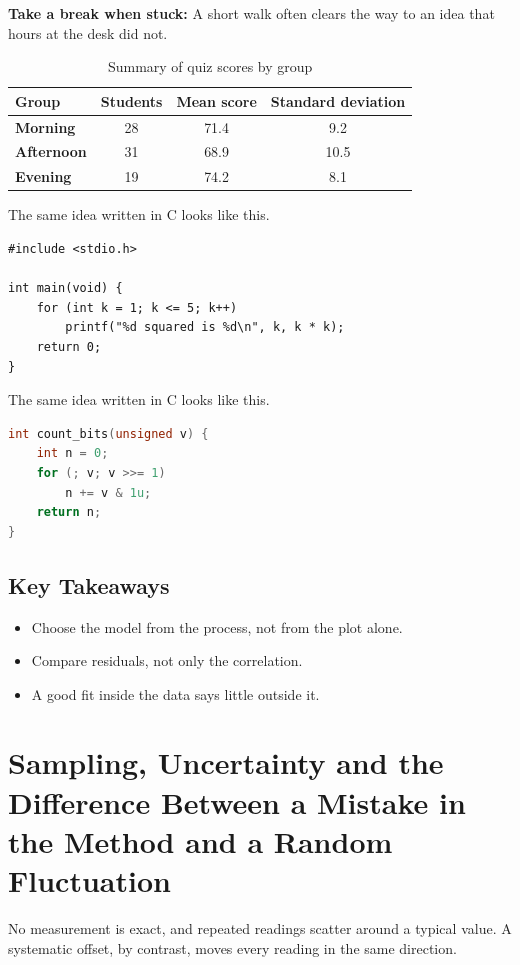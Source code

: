 \documentclass[11pt]{article}
\begin{document}
\textbf{Take a break when stuck:} A short walk often clears the way to an idea that hours at the desk did not.

\begin{table}[H]
\centering
\caption{Summary of quiz scores by group}
\begin{tabular}{lccc}
\toprule
\textbf{Group} & \textbf{Students} & \textbf{Mean score} & \textbf{Standard deviation} \\
\midrule
\textbf{Morning} & 28 & 71.4 & 9.2 \\
\textbf{Afternoon} & 31 & 68.9 & 10.5 \\
\textbf{Evening} & 19 & 74.2 & 8.1 \\
\bottomrule
\end{tabular}
\end{table}

The same idea written in C looks like this.

{\small\begin{verbatim}
#include <stdio.h>

int main(void) {
    for (int k = 1; k <= 5; k++)
        printf("%d squared is %d\n", k, k * k);
    return 0;
}
\end{verbatim}}

The same idea written in C looks like this.

\begin{lstlisting}[language=C]
int count_bits(unsigned v) {
    int n = 0;
    for (; v; v >>= 1)
        n += v & 1u;
    return n;
}
\end{lstlisting}

\subsection*{Key Takeaways}
\begin{itemize}
\item Choose the model from the process, not from the plot alone.
\item Compare residuals, not only the correlation.
\item A good fit inside the data says little outside it.
\end{itemize}

\section{Sampling, Uncertainty and the Difference Between a Mistake in the Method and a Random Fluctuation}

No measurement is exact, and repeated readings scatter around a typical value. A systematic offset, by contrast, moves every reading in the same direction.
\end{document}

